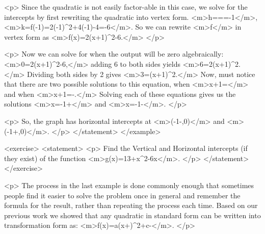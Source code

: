                 <p>
                    Since the quadratic is not easily factor-able in this case, we solve for the intercepts by first rewriting the quadratic into vertex form.
                    <m>h===-1</m>, <m>k=f(-1)=2(-1)^{2}+4(-1)-4=-6</m>.
                    So we can rewrite <m>f</m> in vertex form as <m>f(x)=2(x+1)^{2}-6.</m>
                </p>

                <p>
                    Now we can solve for when the output will be zero algebraically: <m>0=2(x+1)^{2}-6,</m> adding 6 to both sides yields <m>6=2(x+1)^{2}.</m> Dividing both sides by 2 gives <m>3=(x+1)^{2}.</m> Now, must notice that there are two possible solutions to this equation, when <m>x+1=</m> and when <m>x+1=-.</m> Solving each of these equations gives us the solutions <m>x=-1+</m> and <m>x=-1-</m>.
                </p>

                <p>
                    So, the graph has horizontal intercepts at <m>(-1-,0)</m> and <m>(-1+,0)</m>.
                </p>
            </statement>
        </example>

        <exercise>
            <statement>
                <p>
                    Find the Vertical and Horizontal intercepts (if they exist) of the function <m>g(x)=13+x^{2}-6x</m>.
                </p>
            </statement>
        </exercise>

        <p>
            The process in the last example is done commonly enough that sometimes people find it easier to solve the problem once in general and remember the formula for the result, rather than repeating the process each time.
            Based on our previous work we showed that any quadratic in standard form can be written into transformation form as: <m>f(x)=a(x+)^{2}+c-</m>.
        </p>

